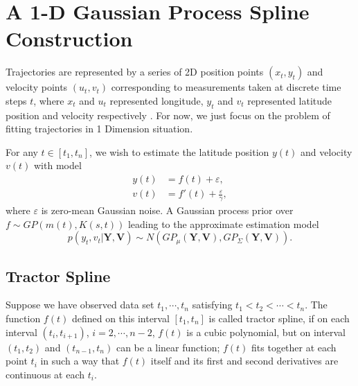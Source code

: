 \section{A 1-D Gaussian Process Spline Construction}
Trajectories are represented by a series of 2D position points $(x_t,y_t)$ and velocity points $(u_t,v_t)$ corresponding to measurements taken at discrete time steps $t$, where $x_t$ and $u_t$ represented longitude, $y_t$ and $v_t$ represented latitude position and velocity respectively \cite{ellis2009}. For now, we just focus on the problem of fitting trajectories in 1 Dimension situation. 

For any $t \in [t_1,t_n]$, we wish to estimate the latitude position $y(t)$ and velocity $v(t)$ with model
\begin{align*}
y(t)&=f(t)+\varepsilon,\\
v(t)&=f'(t)+\frac{\varepsilon}{\gamma},
\end{align*}
where $\varepsilon$ is zero-mean Gaussian noise. A Gaussian process prior over $f \sim GP(m(t),K(s,t))$ leading to the approximate estimation model
\begin{equation}\label{xvgp}
p(y_t,v_t | \mathbf{Y}, \mathbf{V}) \sim N(GP_\mu (\mathbf{Y}, \mathbf{V}), GP_\Sigma (\mathbf{Y}, \mathbf{V})).
\end{equation} 

\subsection{Tractor Spline}

Suppose we have observed data set $t_1, \cdots, t_n$ satisfying $t_1<t_2<\cdots<t_n$. The function $f(t)$ defined on this interval $[t_1,t_n]$ is called tractor spline, if on each interval $(t_i,t_{i+1})$, $i=2,\cdots,n-2$, $f(t)$ is a cubic polynomial, but on interval $(t_1,t_2)$ and $(t_{n-1},t_n)$ can be a linear function; $f(t)$ fits together at each point $t_i$ in such a way that $f(t)$ itself and its first and second derivatives are continuous at each $t_i$.  

